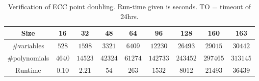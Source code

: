 

\begin{table}[h!]
\begin{center}
\caption{ Verification of ECC point doubling. Run-time given is
  seconds. TO = timeout of 24hrs.}   
\label{tab:eccpointmul}
\begin{tabular}{|c||c|c|c|c|c|c|c|c|} \hline 
Size & 16 & 32 & 48 & 64 & 96 & 128  &160 &163\\
\hline
\#variables &$528$ &$1598$ &$3321$ &$6409$ &$12230$ &$26493$ &$29015$ &$30442$ \\
\hline
\#polynomials &$4640$ &$14523$ &$42324$ &$61274$ &$142733$ &$243452$ &$297465$ &$313145$ \\
\hline
Runtime &$0.10$ &$2.21$ & $54$ &$263$ &$1532$ &$8012$  &$21493$ &$36439$\\
\hline
\end{tabular}
\end{center}
\end{table}



